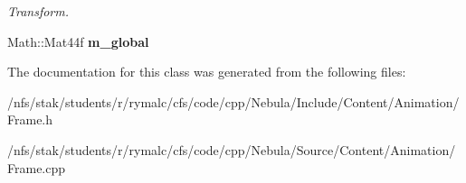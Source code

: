 \begin{DoxyCompactItemize}
\begin{DoxyCompactList}\small\item\em Transform. \item\end{DoxyCompactList}\item 
\hypertarget{classContent_1_1Animation_1_1Frame_a620f08d79764f6fe07938e17c3be6013}{
Math::Mat44f {\bfseries m\_\-global}}
\label{classContent_1_1Animation_1_1Frame_a620f08d79764f6fe07938e17c3be6013}

\end{DoxyCompactItemize}


The documentation for this class was generated from the following files:\begin{DoxyCompactItemize}
\item 
/nfs/stak/students/r/rymalc/cfs/code/cpp/Nebula/Include/Content/Animation/Frame.h\item 
/nfs/stak/students/r/rymalc/cfs/code/cpp/Nebula/Source/Content/Animation/Frame.cpp\end{DoxyCompactItemize}
